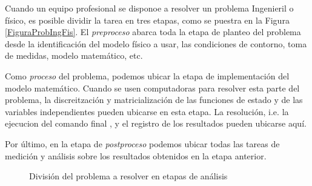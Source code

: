 Cuando un equipo profesional se disponoe a resolver 
un problema Ingenieril o físico, es posible dividir la 
tarea en tres etapas, como se puestra en la Figura 
\autoref{FiguraProbIngFis}.  
El \emph{preproceso} 
abarca toda la etapa de planteo del problema
desde la identificación del modelo físico a 
usar, las condiciones de contorno, toma de 
medidas, modelo matemático, etc. 

Como \emph{proceso} del problema, podemos ubicar
la etapa de implementación del modelo
matemático. Cuando se usen computadoras
para resolver esta parte del problema,
la discreitzación y matricialización de 
las funciones de estado y de las variables
independientes pueden ubicarse en esta 
etapa. La resolución, i.e. la ejecucion
del comando final , y el registro de los
resultados pueden ubicarse aquí.

Por último, en la etapa de 
\emph{postproceso} podemos ubicar todas
las tareas de medición y análisis sobre 
los resultados obtenidos en la etapa
anterior. 

 \begin{figure}
  \caption{División del problema a resolver en etapas de análisis \label{FiguraProbIngFis}}

\end{figure}


\mode*


